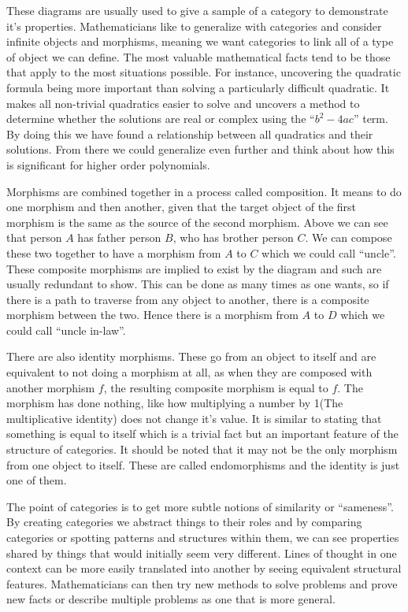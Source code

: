 \documentclass[10pt,a4paper,reqno]{amsart}
\numberwithin{figure}{section}
\begin{document}
These diagrams are usually used to give a sample of a category to demonstrate
it's properties. Mathematicians like to generalize with categories and consider
infinite objects and morphisms, meaning we want categories to link all of a type
of object we can define. The most valuable mathematical facts tend to be those
that apply to the most situations possible. For instance, uncovering the
quadratic formula being more important than solving a particularly difficult
quadratic. It makes all non-trivial quadratics easier to solve and uncovers a
method to determine whether the solutions are real or complex using the
``$b^2-4ac$'' term. By doing this we have found a relationship between all
quadratics and their solutions. From there we could generalize even further
and think about how this is significant for higher order polynomials.

Morphisms are combined together in a process called composition. It means to do
one morphism and then another, given that the target object of the first
morphism is the same as the source of the second morphism. Above we can see
that person $A$ has father person $B$, who has brother person $C$.  We can
compose these two together to have a morphism from $A$ to $C$ which we could
call ``uncle''. These composite morphisms are implied to exist by the diagram
and such are usually redundant to show. This can be done as many times as one
wants, so if there is a path to traverse from any object to another, there is a
composite morphism between the two. Hence there is a morphism from $A$ to $D$
which we could call ``uncle in-law''.

There are also identity morphisms. These go from an object to itself and are
equivalent to not doing a morphism at all, as when they are composed with
another morphism $f$, the resulting composite morphism is equal to $f$. The
morphism has done nothing, like how multiplying a number by 1(The multiplicative
identity) does not change it's value. It is similar to stating that something
is equal to itself which is a trivial fact but an important feature of the
structure of categories. It should be noted that it may not be the only
morphism from one object to itself. These are called endomorphisms and the
identity is just one of them.

The point of categories is to get more subtle notions of similarity or
``sameness''. By creating categories we abstract things to their roles and by
comparing categories or spotting patterns and structures within them, we can see
properties shared by things that would initially seem very different. Lines of
thought in one context can be more easily translated into another by seeing
equivalent structural features. Mathematicians can then try new methods to
solve problems and prove new facts or describe multiple problems as one that is
more general.
\end{document}
